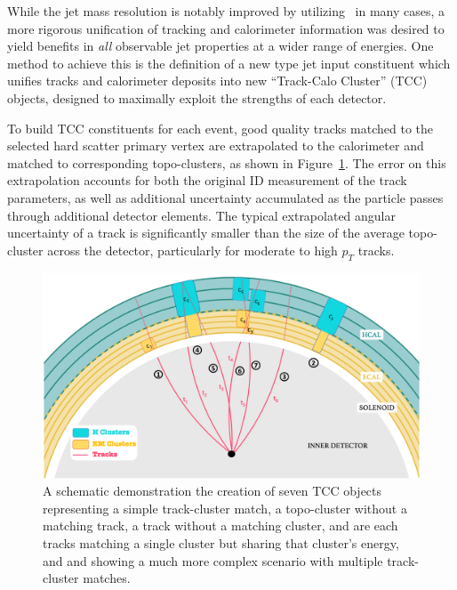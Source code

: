 While the jet mass resolution is notably improved by utilizing \mTA\ in many cases, a more rigorous unification of tracking and calorimeter information was desired to yield benefits in \textit{all} observable jet properties at a wider range of energies.
One method to achieve this is the definition of a new type jet input constituent which unifies tracks and calorimeter deposits into new ``Track-Calo Cluster'' (TCC) objects, designed to maximally exploit the strengths of each detector.

To build TCC constituents for each event, good quality tracks matched to the selected hard scatter primary vertex are extrapolated to the calorimeter and matched to corresponding topo-clusters, as shown in Figure~\ref{fig:tcc_cartoon}.
The error on this extrapolation accounts for both the original ID measurement of the track parameters, as well as additional uncertainty accumulated as the particle passes through additional detector elements.
The typical extrapolated angular uncertainty of a track is significantly smaller than the size of the average topo-cluster across the detector, particularly for moderate to high $p_T$ tracks.

\begin{figure}
	\centering
	\includegraphics[width=\textwidth]{TCC_cartoon}
	\caption{
	A schematic demonstration the creation of seven TCC objects representing  a simple track-cluster match,  a topo-cluster without a matching track,  a track without a matching cluster,  and  are each tracks matching a single cluster but sharing that cluster's energy, and  and  showing a much more complex scenario with multiple track-cluster matches.
    \cite{ATL-PHYS-PUB-2017-015}
	}
	\label{fig:tcc_cartoon}
\end{figure}

